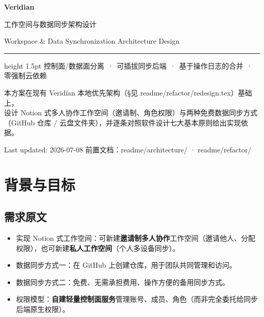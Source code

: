 \documentclass[12pt, a4paper]{article}
\begin{document}
\begin{titlepage}
  \centering
  \vspace*{2.5cm}
  {\Huge\bfseries\color{tsinghuapurple} Veridian}\par
  \vspace{0.6em}
  {\Large\color{sectionblue} 工作空间与数据同步架构设计}\par
  \vspace{0.4em}
  {\large Workspace \& Data Synchronization Architecture Design}\par
  \vspace{2em}
  \hrule height 1.5pt \relax
  \vspace{2em}
  {\normalsize 控制面/数据面分离 \,·\, 可插拔同步后端 \,·\, 基于操作日志的合并 \,·\, 零强制云依赖}\par
  \vspace{3cm}
  {\small
  本方案在现有 Veridian 本地优先架构（\S 见 readme/refactor/redesign.tex）基础上，\\
  设计 Notion 式多人协作工作空间（邀请制、角色权限）与两种免费数据同步方式\\
  （GitHub 仓库 / 云盘文件夹），并逐条对照软件设计七大基本原则给出实现依据。
  }\par
  \vfill
  {\small\color{gray} Last updated: 2026-07-08 \quad 前置文档：readme/architecture/ · readme/refactor/}
\end{titlepage}

\tableofcontents
\newpage

\section{背景与目标}

\subsection{需求原文}

\begin{itemize}[leftmargin=2em, itemsep=2pt]
  \item 实现 Notion 式工作空间：可新建\textbf{邀请制多人协作}工作空间（邀请他人、分配权限），也可新建\textbf{私人工作空间}（个人多设备同步）。
  \item 数据同步方式一：在 GitHub 上创建仓库，用于团队共同管理和访问。
  \item 数据同步方式二：免费、无需承担费用、操作方便的备用同步方式。
  \item 权限模型：\textbf{自建轻量控制面服务}管理账号、成员、角色（而非完全委托给同步后端原生权限）。
\end{itemize}
\end{document}
